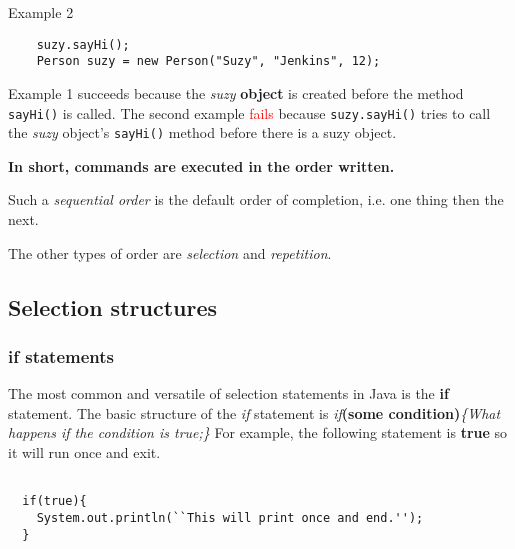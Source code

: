 \documentclass{article}
\begin{document}
\begin{flushleft}
\begin{tcolorbox}[enhanced,breakable, before upper={\let\clearpage\relax}, width=5in,center upper,fontupper=\bfseries,drop fuzzy shadow southeast,boxrule=0.4pt,sharp corners,colframe=pink!80!red,colback=pink!10]
  {\Large Example 2}
  \begin{verbatim}
    suzy.sayHi();
    Person suzy = new Person("Suzy", "Jenkins", 12);
  \end{verbatim}
\end{tcolorbox}

Example 1 succeeds because the \emph{suzy} \textbf{object} is created before the method \texttt{sayHi()} is called. The second example \textcolor{red}{fails} because \texttt{suzy.sayHi()} tries to call the \emph{suzy} object's \texttt{sayHi()} method before there is a suzy object.\par
\begin{center}
\begin{tcolorbox}[enhanced,width=5in,center upper,size=fbox,
    fontupper=\large\bfseries,drop shadow southwest,sharp corners]
\textbf{In short, commands are executed in the order written.}
\end{tcolorbox}
\end{center}

Such a \emph{sequential order} is the default order of completion, i.e. one thing then the next. 

The other types of order are \emph{selection} and \emph{repetition}.

\subsection{Selection structures}
\subsubsection{\textbf{if} statements}

The most common and versatile of selection statements in Java is the \textbf{if} statement.
The basic structure of the \emph{if} statement is \emph{if}\textbf{(some condition)}\emph{\{What happens if the condition is true;\}}
For example, the following statement is \textbf{true} so it will run once and exit.
\begin{verbatim}

  if(true){
    System.out.println(``This will print once and end.'');
  }


\end{verbatim}
\end{flushleft}
\end{document}
